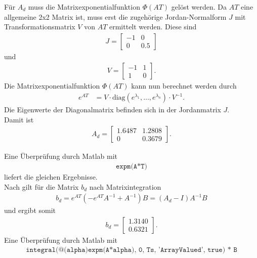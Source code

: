 \documentclass[11pt]{scrartcl} %
\begin{document}
Für $A_d$ muss die Matrixexponentialfunktion $\Phi(AT)$ gelöst werden. Da $AT$ eine allgemeine 2x2 Matrix ist, muss erst die zugehörige Jordan-Normalform $J$ mit Transformationsmatrix $V$ von $AT$ ermittelt werden. Diese sind
\begin{align*}
J = \begin{bmatrix}
-1 & 0 \\
0 & 0.5
\end{bmatrix}
\end{align*}
und
\begin{align*}
V = \begin{bmatrix}
-1 & 1\\
1 & 0
\end{bmatrix}.
\end{align*}
Die Matrixexponentialfunktion $\Phi(AT)$ kann nun berechnet werden durch
\begin{align*}
e^{AT}  &= V \cdot \text{diag}\left(e^{\lambda_1}, \dots, e^{\lambda_n}\right) \cdot V^{-1}.
\end{align*}
Die Eigenwerte der Diagonalmatrix befinden sich in der Jordanmatrix $J$.\\

Damit ist
\begin{align*}
A_d = \begin{bmatrix}
1.6487 & 1.2808 \\
0 & 0.3679
\end{bmatrix}.
\end{align*}

Eine Überprüfung durch Matlab mit 
\begin{align*}
\texttt{expm(A*T)}
\end{align*}
liefert die gleichen Ergebnisse.\\

Nach \cite{gajic2003linear} gilt für die Matrix $b_d$ nach Matrixintegration
\begin{align*}
b_d = e^{AT}\left( -e^{AT}A^{-1}+A^{-1} \right) B = \left( A_d - I \right) A^{-1}B
\end{align*}
und ergibt somit
\begin{align*}
b_d = \begin{bmatrix}
1.3140 \\
0.6321
\end{bmatrix}.
\end{align*}
Eine Überprüfung durch Matlab mit
\begin{align*}
\texttt{integral(@(alpha)expm(A*alpha), 0, Ts, 'ArrayValued', true) * B}
\end{align*}
\end{document}
